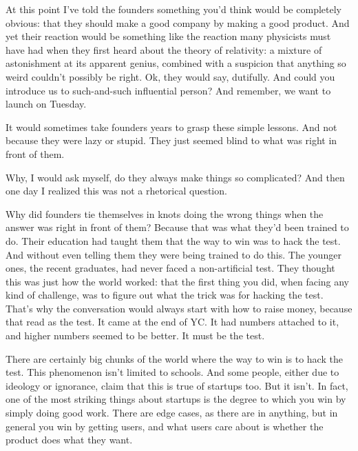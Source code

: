 At this point I've told the founders something
                  you'd think would be completely obvious: that they should make
                  a good company by making a good product. And yet their
                  reaction would be something like the reaction many physicists
                  must have had when they first heard about the theory of
                  relativity: a mixture of astonishment at its apparent genius,
                  combined with a suspicion that anything so weird couldn't
                  possibly be right. Ok, they would say, dutifully. And could
                  you introduce us to such-and-such influential person? And
                  remember, we want to launch on Tuesday.

It would
                  sometimes take founders years to grasp these simple lessons.
                  And not because they were lazy or stupid. They just seemed
                  blind to what was right in front of them.

Why, I
                  would ask myself, do they always make things so complicated?
                  And then one day I realized this was not a rhetorical
                  question.

Why did founders tie themselves in knots
                  doing the wrong things when the answer was right in front of
                  them? Because that was what they'd been trained to do. Their
                  education had taught them that the way to win was to hack the
                  test. And without even telling them they were being trained to
                  do this. The younger ones, the recent graduates, had never
                  faced a non-artificial test. They thought this was just how
                  the world worked: that the first thing you did, when facing
                  any kind of challenge, was to figure out what the trick was
                  for hacking the test. That's why the conversation would always
                  start with how to raise money, because that read as the test.
                  It came at the end of YC. It had numbers attached to it, and
                  higher numbers seemed to be better. It must be the test.

There
                  are certainly big chunks of the world where the way to win is
                  to hack the test. This phenomenon isn't limited to schools.
                  And some people, either due to ideology or ignorance, claim
                  that this is true of startups too. But it isn't. In fact, one
                  of the most striking things about startups is the degree to
                  which you win by simply doing good work. There are edge cases,
                  as there are in anything, but in general you win by getting
                  users, and what users care about is whether the product does
                  what they want.

